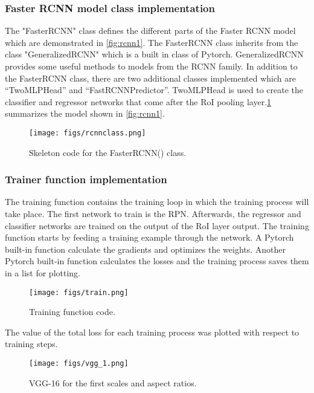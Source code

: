 \subsubsection{Faster RCNN model class implementation}
The "FasterRCNN" class defines the different parts of the Faster RCNN model which are demonstrated in \cref{fig:rcnn1}. The FasterRCNN class inherits from the class "GeneralizedRCNN" which is a built in class of Pytorch. GeneralizedRCNN provides some useful methods to models from the RCNN family. In addition to the FasterRCNN class, there are two additional classes implemented which are ``TwoMLPHead'' and ``FastRCNNPredictor''. TwoMLPHead is used to create the classifier and regressor networks that come after the RoI pooling layer.\cref{fig:rcnnclass} summarizes the model shown in \cref{fig:rcnn1}.

\begin{figure}[!htpb]
	\centering
	\texttt{[image: figs/rcnnclass.png]}
	\caption{Skeleton code for the FasterRCNN() class.}\label{fig:rcnnclass}
\end{figure}

\subsubsection{Trainer function implementation}

The training function contains the training loop in which the training process will take place. The first network to train is the RPN. Afterwards, the regressor and classifier networks are trained on the output of the RoI layer output. The training function starts by feeding a training example through the network. A Pytorch built-in function calculate the gradients and optimizes the weights. Another Pytorch built-in function calculates the losses and the training process saves them in a list for plotting.

\begin{figure}[!htpb]
	\centering
	\texttt{[image: figs/train.png]}
	\caption{Training function code.}\label{fig:train}
\end{figure}
The value of the total loss for each training process was plotted with respect to training steps.

\begin{figure}[!htpb]
	\centering
	\texttt{[image: figs/vgg\_1.png]}
	\caption{VGG-16 for the first scales and aspect ratios.}\label{fig:vgg3_}
\end{figure}

